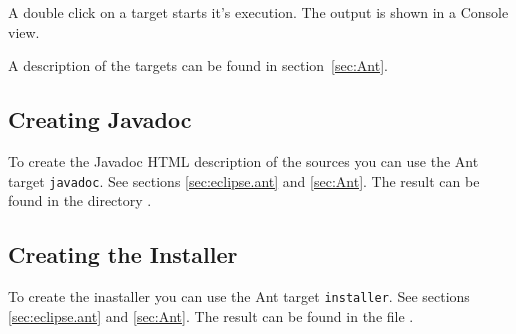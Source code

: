 A double click on a target starts it's execution. The output is shown
in a Console view.

A description of the targets can be found in section~\ref{sec:Ant}.


\subsection{Creating Javadoc}

To create the Javadoc HTML description of the sources you can use the
Ant target \texttt{javadoc}. See sections \ref{sec:eclipse.ant} and
\ref{sec:Ant}. The result can be found in the directory
.


\subsection{Creating the Installer}

To create the inastaller you can use the Ant target
\texttt{installer}. See sections \ref{sec:eclipse.ant} and
\ref{sec:Ant}. The result can be found in the file
.


